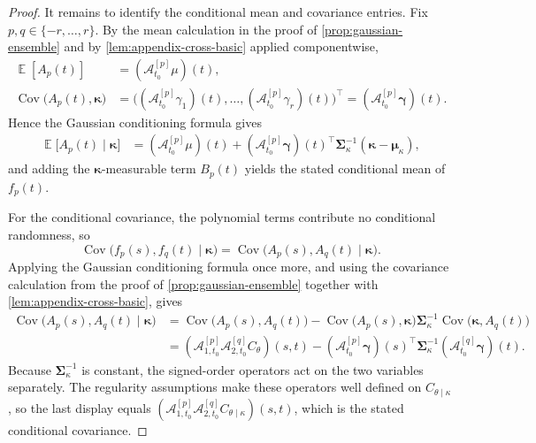 \documentclass[11pt,a4paper]{article}
\theoremstyle{definition}
\theoremstyle{remark}
\DeclareMathOperator{\E}{\mathbb{E}}
\DeclareMathOperator{\Cov}{Cov}
\begin{document}
\begin{proof}
It remains to identify the conditional mean and covariance entries. Fix \(p,q\in\{-r,\ldots,r\}\). By the mean calculation in the proof of \cref{prop:gaussian-ensemble} and by \cref{lem:appendix-cross-basic} applied componentwise,
\begin{align*}
\E[A_p(t)]&=(\mathcal A_{t_0}^{[p]}\mu)(t),\\
\Cov\bigl(A_p(t),\boldsymbol{\kappa}\bigr)
&=\bigl((\mathcal A_{t_0}^{[p]}\gamma_1)(t),\ldots,(\mathcal A_{t_0}^{[p]}\gamma_r)(t)\bigr)^\top
=(\mathcal A_{t_0}^{[p]}\boldsymbol{\gamma})(t).
\end{align*}
Hence the Gaussian conditioning formula gives
\begin{align*}
\E\bigl[A_p(t)\mid \boldsymbol{\kappa}\bigr]
&=
(\mathcal A_{t_0}^{[p]}\mu)(t)
+
(\mathcal A_{t_0}^{[p]}\boldsymbol{\gamma})(t)^\top
\boldsymbol{\Sigma}_{\kappa}^{-1}
(\boldsymbol{\kappa}-\boldsymbol{\mu}_{\kappa}),
\end{align*}
and adding the \(\boldsymbol{\kappa}\)-measurable term \(B_p(t)\) yields the stated conditional mean of \(f_p(t)\).

For the conditional covariance, the polynomial terms contribute no conditional randomness, so
\[
\Cov\bigl(f_p(s),f_q(t)\mid \boldsymbol{\kappa}\bigr)
=
\Cov\bigl(A_p(s),A_q(t)\mid \boldsymbol{\kappa}\bigr).
\]
Applying the Gaussian conditioning formula once more, and using the covariance calculation from the proof of \cref{prop:gaussian-ensemble} together with \cref{lem:appendix-cross-basic}, gives
\begin{align*}
\Cov\bigl(A_p(s),A_q(t)\mid \boldsymbol{\kappa}\bigr)
&=
\Cov\bigl(A_p(s),A_q(t)\bigr)
-
\Cov\bigl(A_p(s),\boldsymbol{\kappa}\bigr)
\boldsymbol{\Sigma}_{\kappa}^{-1}
\Cov\bigl(\boldsymbol{\kappa},A_q(t)\bigr)\\
&=
(\mathcal A_{1,t_0}^{[p]}\mathcal A_{2,t_0}^{[q]}C_\theta)(s,t)
-
(\mathcal A_{t_0}^{[p]}\boldsymbol{\gamma})(s)^\top
\boldsymbol{\Sigma}_{\kappa}^{-1}
(\mathcal A_{t_0}^{[q]}\boldsymbol{\gamma})(t).
\end{align*}
Because \(\boldsymbol{\Sigma}_{\kappa}^{-1}\) is constant, the signed-order operators act on the two variables separately. The regularity assumptions make these operators well defined on \(C_{\theta\mid\kappa}\), so the last display equals $(\mathcal A_{1,t_0}^{[p]}\mathcal A_{2,t_0}^{[q]}C_{\theta\mid\kappa})(s,t)$, which is the stated conditional covariance.
\end{proof}
\end{document}
